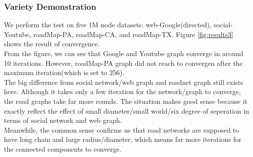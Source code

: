 \subsubsection{Variety Demonstration}
We perform the test on five 1M node datasets: web-Google(directed), social-Youtube, roadMap-PA, roadMap-CA, and roadMap-TX. Figure \ref{fig:results3} shows the result of convergence.\\
From the figure, we can see that Google and Youtube graph converge in around 10 iterations. However, roadMap-PA graph did not reach to convergen after the maximum iteration(which is set to 256). \\
The big difference from social network/web graph and roadnet graph still exists here. Although it takes only a few iteration for the network/graph to converge, the road graphs take far more rounds. The situation makes good sense because it exactly reflect the effect of small diameter/small world/six degree of seperation in terms of social network and web graph. \\
Meanwhile, the common sense confirms us that road networks are supposed to have long chain and large radius/diameter, which means far more iterations for the connected components to converge.\\
